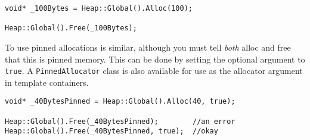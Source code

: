 \begin{verbatim}
void* _100Bytes = Heap::Global().Alloc(100);

Heap::Global().Free(_100Bytes);
\end{verbatim}

To use pinned allocations is similar, although you must tell \textit{both} alloc and free that this is pinned memory. This can be done by setting the optional argument to \verb|true|. A \verb|PinnedAllocator| class is also available for use as the allocator argument in template containers.

\begin{verbatim}
void* _40BytesPinned = Heap::Global().Alloc(40, true);

Heap::Global().Free(_40BytesPinned);        //an error
Heap::Global().Free(_40BytesPinned, true);  //okay
\end{verbatim}
